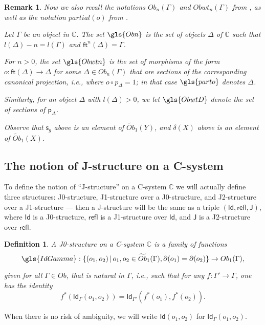 \documentclass[12pt]{article}
\numberwithin{equation}{section}
\newenvironment{eq}{\begin{equation}}{\end{equation}}
\newtheorem{definition}[proposition]{Definition}
\newtheorem{remark}[proposition]{Remark}
\newcommand{\sr}{\rightarrow}
\newcommand{\wt}{\widetilde}
\newcommand{\CC}{{\mathbb C}}  %
\newcommand{\id}{1}            %
\newcommand{\ft}{\mathsf{ft}}
\newcommand{\p}{\mathsf{p}}
\newcommand{\s}{\mathsf{s}}     %
\newcommand{\Id}{\mathsf{Id}} %
\newcommand{\refl}{\mathsf{refl}}
\newcommand{\J}{\mathsf{J}}
\newcommand{\Ob}{Ob}
\newcommand{\Obwt}{\wt{Ob}}
\begin{document}
\begin{remark}
  Now we also recall the notations ${{Ob}}_n(\Gamma)$ and
  $Obwt_n(\Gamma)$ from \cite[\S 3]{fromunivwithPiI}, as well as the
  notation ${partial}(o)$ from \cite[\S 3]{Csubsystems}.

  Let $\Gamma$ be an object in $\CC$.  The set $\gls{Obn}$ is the set of
  objects $\Delta$ of $\CC$ such that $l(\Delta)-n = l(\Gamma)$ and
  $\ft^n(\Delta) = \Gamma$.

  For $n>0$, the set $\gls{Obwtn}$ is the set of morphisms of the form
  $o : \ft(\Delta) \sr \Delta$ for some $\Delta \in \Ob_n(\Gamma)$ that are sections
  of the corresponding canonical projection, i.e., where $o \circ p_\Delta = \id$;
  in that case $\gls{parto}$ denotes $\Delta$.

  Similarly, for an object $\Delta$ with $l(\Delta) > 0$, we let
  $\gls{ObwtD}$ denote the set of sections of $\p_\Delta$.

  Observe that $\s_g$ above is an element of $\Obwt_1(Y)$, and $\delta(X)$ above
  is an element of $\Obwt_1(X)$.
\end{remark}

\subsection{The notion of J-structure on a C-system}
%


To define the notion of ``J-structure'' on a C-system $\CC$ we will actually define three
structures: J0-structure, J1-structure over a J0-structure, and J2-structure
over a J1-structure --- then a J-structure will be the same as a triple
$(\Id,\refl,\J)$, where $\Id$ is a J0-structure, $\refl$ is a J1-structure over
$\Id$, and $\J$ is a J2-structure over $\refl$.

\begin{definition}
\label{2015.03.27.def1}
A {\em J0-structure} on a C-system $\CC$ is a family of functions 
%
$$\gls{IdGamma}:\{(o_1,o_2)\,|\,o_1, o_2 \in \Obwt_1(\Gamma), \partial(o_1)=\partial(o_2)\}\sr Ob_1(\Gamma),$$

given for all $\Gamma\in Ob$, that is natural in $\Gamma$, i.e., such that for any
$f:\Gamma'\sr \Gamma$, one has the identity
\begin{eq}
  \label{Id-naturality}
  f^*(\Id_{\Gamma}(o_1,o_2))=\Id_{\Gamma'}(f^*(o_1),f^*(o_2)).
\end{eq}%
\end{definition}

When there is no risk of ambiguity, we will write $\Id(o_1,o_2)$ for $\Id_{\Gamma}(o_1,o_2)$.
\end{document}
